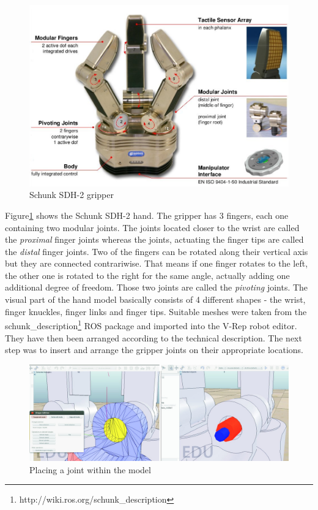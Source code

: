 \begin{figure}[ht]
	\centering
  	\includegraphics[width=1.0\textwidth]{images/sdh_sheet.jpg}
	\caption[Schunk SDH-2 (source: Schunk data sheet\cite{buss2004})]{Schunk SDH-2 gripper}
	\label{fig:sdh_sheet}
\end{figure}

Figure\ref{fig:sdh_sheet} shows the Schunk SDH-2 hand. The gripper has 3 fingers, each one containing two modular joints. The joints located closer to the wrist are called the \emph{proximal} finger joints whereas the joints, actuating the finger tips are called the \emph{distal} finger joints. Two of the fingers can be rotated along their vertical axis but they are connected contrariwise. That means if one finger rotates to the left, the other one is rotated to the right for the same angle, actually adding one additional degree of freedom. Those two joints are called the \emph{pivoting} joints. The visual part of the hand model basically consists of 4 different shapes - the wrist, finger knuckles, finger links and finger tips. Suitable meshes were taken from the schunk\_description\footnote{http://wiki.ros.org/schunk\_description} ROS package and imported into the V-Rep robot editor. They have then been arranged according to the technical description. The next step was to insert and arrange the gripper joints on their appropriate locations.

\begin{figure}[t]
	\centering
  	\includegraphics[width=1.0\textwidth]{images/place_joint.jpg}
	\caption{Placing a joint within the model}
	\label{fig:place_jnt}
\end{figure}

